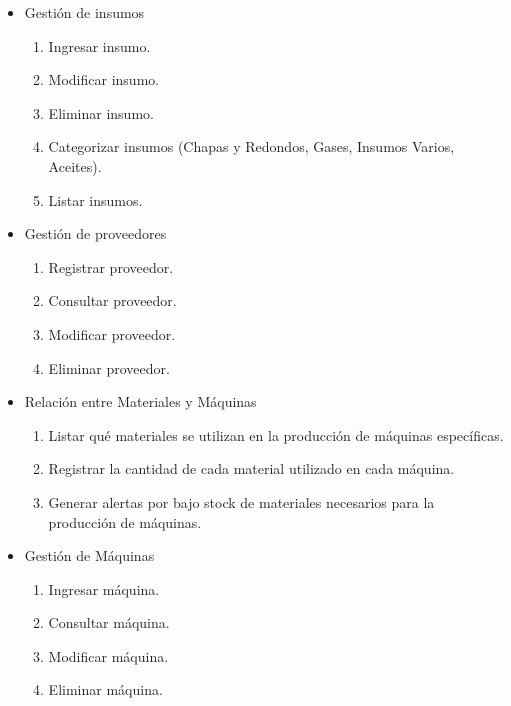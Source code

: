 \documentclass{article}
\begin{document}
\begin{itemize}
	\item Gestión de insumos
	\begin{enumerate}
		\item Ingresar insumo.
		\item Modificar insumo.
		\item Eliminar insumo.
		\item Categorizar insumos (Chapas y Redondos, Gases, Insumos Varios, Aceites).
		\item Listar insumos.
	\end{enumerate}
\end{itemize}

\begin{itemize}
	\item Gestión de proveedores
	\begin{enumerate}[start=6]
		\item Registrar proveedor.
		\item Consultar proveedor.
		\item Modificar proveedor.
		\item Eliminar proveedor.
	\end{enumerate}
\end{itemize}

\begin{itemize}
	\item Relación entre Materiales y Máquinas
	\begin{enumerate}[start=10]
		\item Listar qué materiales se utilizan en la producción de máquinas específicas.
		\item Registrar la cantidad de cada material utilizado en cada máquina.
		\item Generar alertas por bajo stock de materiales necesarios para la producción de máquinas.
	\end{enumerate}
\end{itemize}

\begin{itemize}
	\item Gestión de Máquinas
	\begin{enumerate}[start=13]
		\item Ingresar máquina.
		\item Consultar máquina.
		\item Modificar máquina.
		\item Eliminar máquina.
	\end{enumerate}
\end{itemize}
\end{document}
